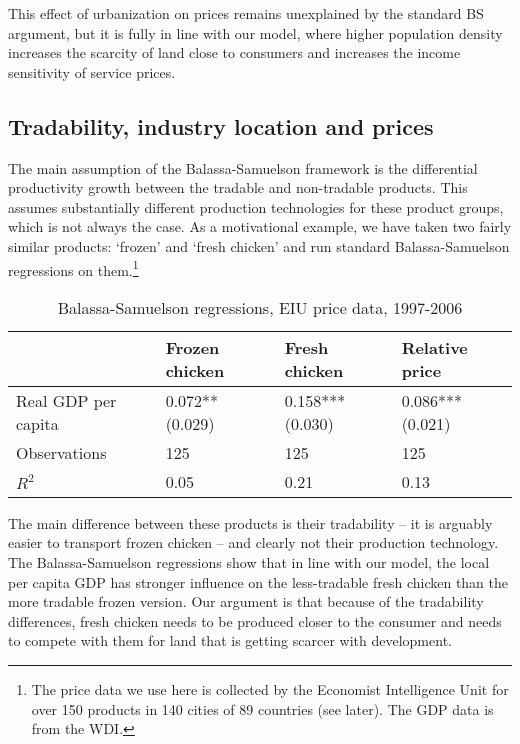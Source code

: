 \documentclass[12pt]{article}
\begin{document}
This effect of urbanization on prices remains unexplained by the standard BS argument, but it is fully in line with our model, where higher population density increases the scarcity of land close to consumers and increases the income sensitivity of service prices.

\subsection{Tradability, industry location and prices}

The main assumption of the Balassa-Samuelson framework is the differential productivity growth between the tradable and non-tradable products. This assumes substantially different production technologies for these product groups, which is not always the case. As a motivational example, we have taken two fairly similar products: `frozen' and `fresh chicken' and run standard Balassa-Samuelson regressions on them.\footnote{The price data we use here is collected by the Economist Intelligence Unit for over 150 products in 140 cities of 89 countries (see later). The GDP data is from the WDI.}

\begin{table}[h!]
\center
\caption{Balassa-Samuelson regressions, EIU price data, 1997-2006}
\begin{tabular}{lm{5em}m{5em}m{5em}}
  \hline\hline
   & Frozen chicken & Fresh chicken & Relative price\\
   \hline
  Real GDP per capita & 0.072**   (0.029) & 0.158***   (0.030) & 0.086***   (0.021)\\
\hline
  Observations &  125 & 125 & 125
\\
  $R^2$ &  0.05& 0.21 & 0.13
\\
  \hline\hline
\end{tabular}
\end{table}

The main difference between these products is their tradability -- it is arguably easier to transport frozen chicken -- and clearly not their production technology. The Balassa-Samuelson regressions show that in line with our model, the local per capita GDP has stronger influence on the less-tradable fresh chicken than the more tradable frozen version. Our argument is that because of the tradability differences, fresh chicken needs to be produced closer to the consumer and needs to compete with them for land that is getting scarcer with development.
\end{document}

